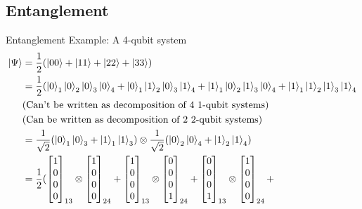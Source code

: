 \documentclass{beamer}
\begin{document}
\subsection{Entanglement}
\begin{frame}{Entanglement}
  {\tiny
    Example: A 4-qubit system
    \begin{align*}
      \ket{\Psi} &= \frac{1}{2} (\ket{00} + \ket{11} + \ket{22} + \ket{33}) \\
                 &= \frac{1}{2} (\ket{0}_1\ket{0}_2\ket{0}_3\ket{0}_4 + \ket{0}_1\ket{1}_2\ket{0}_3\ket{1}_4 + \ket{1}_1\ket{0}_2\ket{1}_3\ket{0}_4 + \ket{1}_1\ket{1}_2\ket{1}_3\ket{1}_4 \\
                   &  \text{(Can't be written as decomposition of 4 1-qubit systems)} \\
                   &  \text{(Can be written as decomposition of 2 2-qubit systems)} \\
                 &= \frac{1}{\sqrt{2}} (\ket{0}_1\ket{0}_3  + \ket{1}_1\ket{1}_3) \otimes  \frac{1}{\sqrt{2}} (\ket{0}_2\ket{0}_4  + \ket{1}_2\ket{1}_4) \\
                 &= \frac{1}{2} ( \begin{bmatrix} 1 \\ 0 \\ 0 \\ 0 \end{bmatrix}_{13} \otimes  \begin{bmatrix} 1 \\ 0 \\ 0 \\ 0 \end{bmatrix}_{24} +
                                  \begin{bmatrix} 1 \\ 0 \\ 0 \\ 0 \end{bmatrix}_{13} \otimes  \begin{bmatrix} 0 \\ 0 \\ 0 \\ 1 \end{bmatrix}_{24} +
                                  \begin{bmatrix} 0 \\ 0 \\ 0 \\ 1 \end{bmatrix}_{13} \otimes  \begin{bmatrix} 1 \\ 0 \\ 0 \\ 0 \end{bmatrix}_{24} +

\end{align*}}
\end{frame}
\end{document}
